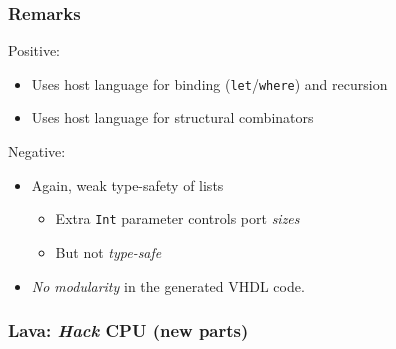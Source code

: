         \begin{frame}
            \frametitle{Remarks}

            \par{Positive:}
            \begin{itemize}
                \item Uses host language for binding (\texttt{let}/\texttt{where}) and recursion
                \item Uses host language for structural combinators
            \end{itemize}

            \par{Negative:}
            \begin{itemize}
                \item Again, weak type-safety of lists
                    \begin{itemize}
                        \item Extra \texttt{Int} parameter controls port \emph{sizes}
                        \item But not \emph{type-safe}
                    \end{itemize}
                \item \emph{No modularity} in the generated VHDL code.
            \end{itemize}

        \end{frame}

        \begin{frame}
            \frametitle{Lava: \emph{Hack} CPU (new parts)}

        \end{frame}


